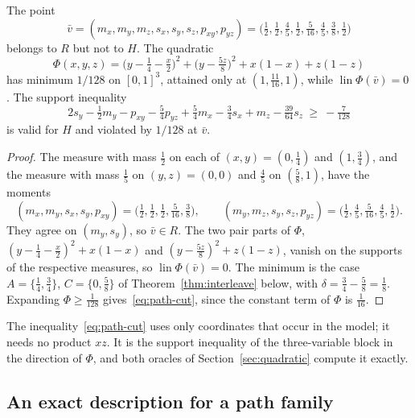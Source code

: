 \begin{proposition}\label{prop:path-gap}
The point
\begin{equation}\label{eq:witness}
\bar v=(m_x,m_y,m_z,s_x,s_y,s_z,p_{xy},p_{yz})
=\bigl(\tfrac12,\tfrac12,\tfrac45,\tfrac12,\tfrac5{16},\tfrac45,\tfrac38,\tfrac12\bigr)
\end{equation}
belongs to $R$ but not to $H$. The quadratic
\begin{equation}\label{eq:Phi-example}
\Phi(x,y,z)=\bigl(y-\tfrac14-\tfrac x2\bigr)^2+\bigl(y-\tfrac{5z}8\bigr)^2+x(1-x)+z(1-z)
\end{equation}
has minimum $1/128$ on $[0,1]^3$, attained only at $(1,\tfrac{11}{16},1)$,
while $\operatorname{lin}\Phi(\bar v)=0$. The support inequality
\begin{equation}\label{eq:path-cut}
2s_y-\tfrac12m_y-p_{xy}-\tfrac54p_{yz}+\tfrac54m_x-\tfrac34s_x+m_z-\tfrac{39}{64}s_z\ \ge\ -\tfrac7{128}
\end{equation}
is valid for $H$ and violated by $1/128$ at $\bar v$.
\end{proposition}

\begin{proof}
The measure with mass $\tfrac12$ on each of $(x,y)=(0,\tfrac14)$ and
$(1,\tfrac34)$, and the measure with mass $\tfrac15$ on $(y,z)=(0,0)$ and
$\tfrac45$ on $(\tfrac58,1)$, have the moments
\[
(m_x,m_y,s_x,s_y,p_{xy})=\bigl(\tfrac12,\tfrac12,\tfrac12,\tfrac5{16},\tfrac38\bigr),\qquad
(m_y,m_z,s_y,s_z,p_{yz})=\bigl(\tfrac12,\tfrac45,\tfrac5{16},\tfrac45,\tfrac12\bigr).
\]
They agree on $(m_y,s_y)$, so $\bar v\in R$. The two pair parts of $\Phi$,
$(y-\tfrac14-\tfrac x2)^2+x(1-x)$ and $(y-\tfrac{5z}8)^2+z(1-z)$, vanish on
the supports of the respective measures, so $\operatorname{lin}\Phi(\bar v)=0$.
The minimum is the case $A=\{\tfrac14,\tfrac34\}$, $C=\{0,\tfrac58\}$ of
Theorem~\ref{thm:interleave} below, with $\delta=\tfrac34-\tfrac58=\tfrac18$.
Expanding $\Phi\ge\tfrac1{128}$ gives~\eqref{eq:path-cut}, since the constant
term of $\Phi$ is $\tfrac1{16}$.
\end{proof}

The inequality~\eqref{eq:path-cut} uses only coordinates that occur in the
model; it needs no product $xz$. It is the support inequality of the
three-variable block in the direction of $\Phi$, and both oracles of
Section~\ref{sec:quadratic} compute it exactly.

\subsection{An exact description for a path family}\label{sec:interleave}

